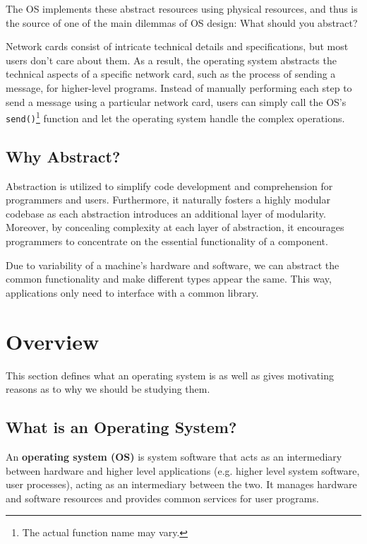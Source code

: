 \documentclass{report}
\begin{document}
The OS implements these abstract resources using physical resources, and thus is the source of one
of the main dilemmas of OS design: What should you abstract?

\begin{tcolorbox}[colback=blue!5!white,colframe=black!75!blue,title=Example: Network Neverland]
  Network cards consist of intricate technical details and specifications, but most users don't care
  about them. As a result, the operating system abstracts the technical aspects of a
  specific network card, such as the process of sending a message, for higher-level programs. Instead
  of manually performing each step to send a message using a particular network card, users can simply
  call the OS's \texttt{send()}\footnote{The actual function name may vary.} function and let the
  operating system handle the complex operations. 
\end{tcolorbox}


\section*{Why Abstract?}
Abstraction is utilized to simplify code development and comprehension for programmers and
users. Furthermore, it naturally fosters a highly modular codebase as each abstraction introduces an
additional layer of modularity. Moreover, by concealing complexity at each layer of abstraction, it
encourages programmers to concentrate on the essential functionality of a component. 

Due to variability of a machine's hardware and software, we can abstract the common
functionality and make different types appear the same. This way, applications only need to
interface with a common library. 





\chapter{Overview}
This section defines what an operating system is as well as gives motivating reasons as to why we
should be studying them. 


\section{What is an Operating System?}
\begin{tcolorbox}[title=Definition: Operating System]
  An \textbf{operating system (OS)} is system software that acts as an intermediary between hardware and
  higher level applications (e.g. higher level system software, user processes), acting as an
  intermediary between the two. It manages hardware and software resources and provides common
  services for user programs. 
\end{tcolorbox}
\end{document}
